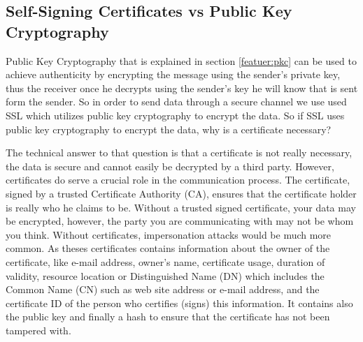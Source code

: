 \subsection{Self-Signing Certificates vs Public Key Cryptography}
Public Key Cryptography that is explained in section \ref{featuer:pkc} can be used to achieve authenticity by encrypting the message using the sender's private key, thus the receiver once he decrypts using the sender's key he will know that is sent form the sender. So in order to send data through a secure channel we use used SSL which utilizes public key cryptography to encrypt the data. So if SSL uses public key cryptography to encrypt the data, why is a certificate necessary?
\par The technical answer to that question is that a certificate is not really necessary, the data is secure and cannot easily be decrypted by a third party. However, certificates do serve a crucial role in the communication process. The certificate, signed by a trusted Certificate Authority (CA), ensures that the certificate holder is really who he claims to be. Without a trusted signed certificate, your data may be encrypted, however, the party you are communicating with may not be whom you think. Without certificates, impersonation attacks would be much more common. As theses certificates contains information about the owner of the certificate, like e-mail address, owner's name, certificate usage, duration of validity, resource location or Distinguished Name (DN) which includes the Common Name (CN) such as web site address or e-mail address, and the certificate ID of the person who certifies (signs) this information. It contains also the public key and finally a hash to ensure that the certificate has not been tampered with.